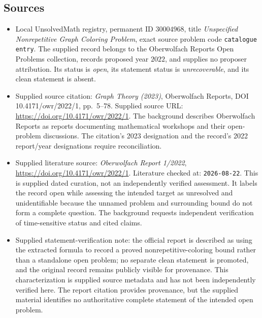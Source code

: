 \documentclass[11pt]{article}
\begin{document}
\subsection{Sources}
\begin{itemize}
\item Local UnsolvedMath registry, permanent ID \(30004968\), title \emph{Unspecified Nonrepetitive Graph Coloring Problem}, exact source problem code \texttt{catalogue entry}. The supplied record belongs to the Oberwolfach Reports Open Problems collection, records proposed year \(2022\), and supplies no proposer attribution. Its status is \emph{open}, its statement status is \emph{unrecoverable}, and its clean statement is absent.
\item Supplied source citation: \emph{Graph Theory (2023)}, Oberwolfach Reports, DOI 10.4171/owr/2022/1, pp.\ 5--78. Supplied source URL: \url{https://doi.org/10.4171/owr/2022/1}. The background describes Oberwolfach Reports as reports documenting mathematical workshops and their open-problem discussions. The citation's 2023 designation and the record's 2022 report/year designations require reconciliation.
\item Supplied literature source: \emph{Oberwolfach Report 1/2022}, \url{https://doi.org/10.4171/owr/2022/1}. Literature checked at: \texttt{2026-08-22}. This is supplied dated curation, not an independently verified assessment. It labels the record open while assessing the intended target as unresolved and unidentifiable because the unnamed problem and surrounding bound do not form a complete question. The background requests independent verification of time-sensitive status and cited claims.
\item Supplied statement-verification note: the official report is described as using the extracted formula to record a proved nonrepetitive-coloring bound rather than a standalone open problem; no separate clean statement is promoted, and the original record remains publicly visible for provenance. This characterization is supplied source metadata and has not been independently verified here. The report citation provides provenance, but the supplied material identifies no authoritative complete statement of the intended open problem.
\end{itemize}
\end{document}
